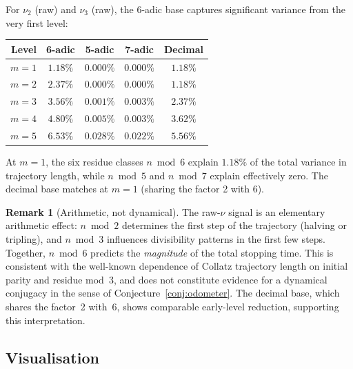 \documentclass[11pt,a4paper]{article}
\theoremstyle{plain}
\theoremstyle{definition}
\newtheorem{remark}[theorem]{Remark}
\begin{document}
\begin{empirical}
\label{obs:sixadic-raw}
    For $\nu_2$ (raw) and $\nu_3$ (raw), the 6-adic base captures
    significant variance from the very first level:
    \begin{center}
    \renewcommand{\arraystretch}{1.15}
    \begin{tabular}{rcccc}
        \toprule
        Level & 6-adic & 5-adic & 7-adic & Decimal \\
        \midrule
        $m = 1$ & $1.18\%$ & $0.000\%$ & $0.000\%$ & $1.18\%$ \\
        $m = 2$ & $2.37\%$ & $0.000\%$ & $0.000\%$ & $1.18\%$ \\
        $m = 3$ & $3.56\%$ & $0.001\%$ & $0.003\%$ & $2.37\%$ \\
        $m = 4$ & $4.80\%$ & $0.005\%$ & $0.003\%$ & $3.62\%$ \\
        $m = 5$ & $6.53\%$ & $0.028\%$ & $0.022\%$ & $5.56\%$ \\
        \bottomrule
    \end{tabular}
    \end{center}
    At $m = 1$, the six residue classes $n \bmod 6$ explain $1.18\%$ of
    the total variance in trajectory length, while $n \bmod 5$ and
    $n \bmod 7$ explain effectively zero.  The decimal base matches at
    $m = 1$ (sharing the factor 2 with 6).
\end{empirical}

\begin{remark}[Arithmetic, not dynamical]
    The raw-$\nu$ signal is an elementary arithmetic effect: $n \bmod 2$
    determines the first step of the trajectory (halving or tripling),
    and $n \bmod 3$ influences divisibility patterns in the first few
    steps.  Together, $n \bmod 6$ predicts the \emph{magnitude} of the
    total stopping time.  This is consistent with the well-known
    dependence of Collatz trajectory length on initial parity and
    residue mod~3, and does not constitute evidence for a dynamical
    conjugacy in the sense of Conjecture~\ref{conj:odometer}.
    The decimal base, which shares the factor~2 with~6, shows
    comparable early-level reduction, supporting this interpretation.
\end{remark}


\subsection{Visualisation}
\end{document}
